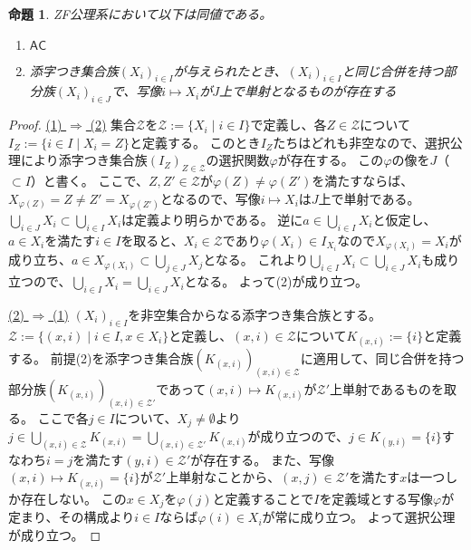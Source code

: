 \documentclass{jarticle}
\newtheorem{proposition}{命題}
\begin{document}
\begin{proposition}
\label{prop:AC_is_equiv_to_identification_of_two_formulations}
ZF公理系において以下は同値である。
\begin{enumerate}
\item
$\mathsf{AC}$
\item
添字つき集合族$(X_i)_{i \in I}$が与えられたとき、$(X_i)_{i \in I}$と同じ合併を持つ部分族$(X_i)_{i \in J}$で、写像$i \mapsto X_i$が$J$上で単射となるものが存在する
\end{enumerate}
\end{proposition}
\begin{proof}
\underline{(1) $\Rightarrow$ (2)}
集合$\mathcal{Z}$を$\mathcal{Z} := \{X_i \mid i \in I\}$で定義し、各$Z \in \mathcal{Z}$について$I_Z := \{i \in I \mid X_i = Z\}$と定義する。
このとき$I_Z$たちはどれも非空なので、選択公理により添字つき集合族$(I_Z)_{Z \in \mathcal{Z}}$の選択関数$\varphi$が存在する。
この$\varphi$の像を$J$（$\subset I$）と書く。
ここで、$Z,Z' \in \mathcal{Z}$が$\varphi(Z) \neq \varphi(Z')$を満たすならば、$X_{\varphi(Z)} = Z \neq Z' = X_{\varphi(Z')}$となるので、写像$i \mapsto X_i$は$J$上で単射である。
$\bigcup_{i \in J} X_i \subset \bigcup_{i \in I} X_i$は定義より明らかである。
逆に$a \in \bigcup_{i \in I} X_i$と仮定し、$a \in X_i$を満たす$i \in I$を取ると、$X_i \in \mathcal{Z}$であり$\varphi(X_i) \in I_{X_i}$なので$X_{\varphi(X_i)} = X_i$が成り立ち、$a \in X_{\varphi(X_i)} \subset \bigcup_{j \in J} X_j$となる。
これより$\bigcup_{i \in I} X_i \subset \bigcup_{i \in J} X_i$も成り立つので、$\bigcup_{i \in I} X_i = \bigcup_{i \in J} X_i$となる。
よって(2)が成り立つ。

\underline{(2) $\Rightarrow$ (1)}
$(X_i)_{i \in I}$を非空集合からなる添字つき集合族とする。
$\mathcal{Z} := \{(x,i) \mid i \in I, x \in X_i\}$と定義し、$(x,i) \in \mathcal{Z}$について$K_{(x,i)} := \{i\}$と定義する。
前提(2)を添字つき集合族$(K_{(x,i)})_{(x,i) \in \mathcal{Z}}$に適用して、同じ合併を持つ部分族$(K_{(x,i)})_{(x,i) \in \mathcal{Z}'}$であって$(x,i) \mapsto K_{(x,i)}$が$\mathcal{Z}'$上単射であるものを取る。
ここで各$j \in I$について、$X_j \neq \emptyset$より$j \in \bigcup_{(x,i) \in \mathcal{Z}} K_{(x,i)} = \bigcup_{(x,i) \in \mathcal{Z}'} K_{(x,i)}$が成り立つので、$j \in K_{(y,i)} = \{i\}$すなわち$i = j$を満たす$(y,i) \in \mathcal{Z}'$が存在する。
また、写像$(x,i) \mapsto K_{(x,i)} = \{i\}$が$\mathcal{Z}'$上単射なことから、$(x,j) \in \mathcal{Z}'$を満たす$x$は一つしか存在しない。
この$x \in X_j$を$\varphi(j)$と定義することで$I$を定義域とする写像$\varphi$が定まり、その構成より$i \in I$ならば$\varphi(i) \in X_i$が常に成り立つ。
よって選択公理が成り立つ。
\end{proof}
\end{document}
